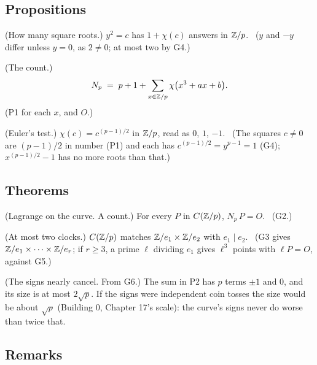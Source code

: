 \subsection*{Propositions}

\begin{lines}
\item[\lab{P1}] (How many square roots.) $y^2 = c$ has $1 + \chi(c)$ answers in $\mathbb{Z}/p$. \ ($y$ and $-y$ differ unless $y = 0$, as $2 \ne 0$; at most two by G4.)
\item[\lab{P2}] (The count.) \[ N_p \;=\; p + 1 + \sum_{x \in \mathbb{Z}/p} \chi\big(x^3 + ax + b\big). \] (P1 for each $x$, and $O$.)
\item[\lab{P3}] (Euler's test.) $\chi(c) = c^{(p-1)/2}$ in $\mathbb{Z}/p$, read as $0$, $1$, $-1$. \ (The squares $c \neq 0$ are $(p - 1)/2$ in number (P1) and each has $c^{(p-1)/2} = y^{p-1} = 1$ (G4); $x^{(p-1)/2} - 1$ has no more roots than that.)
\end{lines}

\subsection*{Theorems}

\begin{lines}
\item[\lab{T1}] (Lagrange on the curve. A count.) For every $P$ in $C(\mathbb{Z}/p)$, $N_p\,P = O$. \ (G2.)
\item[\lab{T2}] (At most two clocks.) $C(\mathbb{Z}/p)$ matches $\mathbb{Z}/e_1 \times \mathbb{Z}/e_2$ with $e_1 \mid e_2$. \ (G3 gives $\mathbb{Z}/e_1 \times \dots \times \mathbb{Z}/e_r$; if $r \ge 3$, a prime $\ell$ dividing $e_1$ gives $\ell^3$ points with $\ell P = O$, against G5.)
\item[\lab{T3}] (The signs nearly cancel. From G6.) The sum in P2 has $p$ terms $\pm 1$ and $0$, and its size is at most $2\sqrt p$. If the signs were independent coin tosses the size would be about $\sqrt p$ (Building 0, Chapter 17's scale): the curve's signs never do worse than twice that.
\end{lines}

\subsection*{Remarks}

